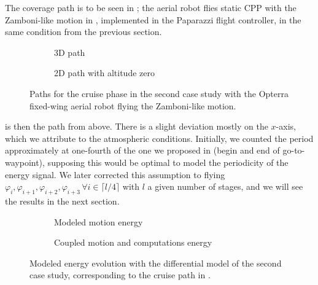 The coverage path is to be seen in ; the aerial robot flies static CPP with the Zamboni-like motion in , implemented in the Paparazzi flight controller, in the same condition from the previous section. 
\begin{figure}[h!]
  \centering
  \selectfont
  \footnotesize
  \begin{subfigure}[c]{0.475\textwidth}
    \centering
    
    \caption{3D path}
    \label{fig:cruise-path}
  \end{subfigure}
  \begin{subfigure}[c]{0.475\textwidth}
    \centering
    
    \vspace*{1.1ex}
    \caption{2D path with altitude zero}
    \label{fig:cruise-xy}
  \end{subfigure}
  \caption[Paths for the cruise phase in the second case study]{Paths for the cruise phase in the second case study with the Opterra fixed-wing aerial robot flying the Zamboni-like motion.}
  \label{fig:cruise-prelim}
\end{figure}
 is then the path from above. There is a slight deviation mostly on the $x$-axis, which we attribute to the atmospheric conditions. Initially, we counted the period approximately at one-fourth of the one we proposed in  (begin and end of go-to-waypoint), supposing this would be optimal to model the periodicity of the energy signal. We later corrected this assumption to flying $\varphi_{i},\varphi_{i+1},\varphi_{i+2},\varphi_{i+3}\,\forall i\in\lceil l/4\rceil$ with $l$ a given number of stages, and we will see the results in the next section. 
\begin{figure}[h!]
  \centering
  \selectfont
  \footnotesize
  \begin{subfigure}[c]{0.43\textwidth}
    \centering
    
    \caption{Modeled motion energy}
    \label{fig:cruise-energy}
  \end{subfigure}
  \begin{subfigure}[c]{0.45\textwidth}
    \centering
    
    \caption{Coupled motion and computations energy}
    \label{fig:cruise-merge}
  \end{subfigure}
  \caption[Modeled energy evolution with the differential of the second case study]{Modeled energy evolution with the differential model of the second case study, corresponding to the cruise path in .}
  \label{fig:cruise-energies}
\end{figure}
